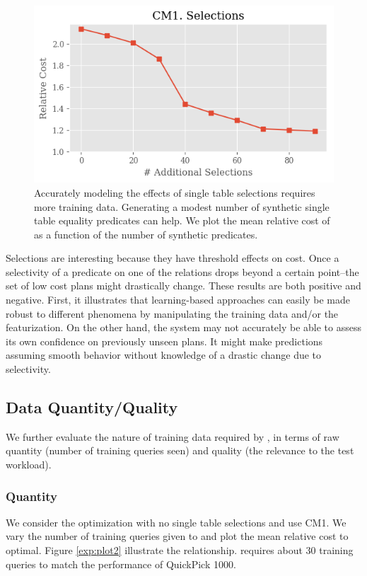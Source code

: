 \begin{figure}
    \centering
    \includegraphics[width=0.8\columnwidth]{exp/exp1_plot1.png}
    \caption{\small{Accurately modeling the effects of single table selections requires more training data. Generating a modest number of synthetic single table equality predicates can help. We plot the mean relative cost of \sys as a function of the number of synthetic predicates.} \label{exp:plot1}}
\end{figure}

Selections are interesting because they have threshold effects on cost. Once a selectivity of a predicate on one of the relations drops beyond a certain point--the set of low cost plans might drastically change. These results are both positive and negative. First, it illustrates that learning-based approaches can easily be made robust to different phenomena by manipulating the training data and/or the featurization. On the other hand, the system may not accurately be able to assess its own confidence on previously unseen plans. It might make predictions assuming smooth behavior without knowledge of a drastic change due to selectivity. 

\subsection{Data Quantity/Quality}
We further evaluate the nature of training data required by \sys, in terms of raw quantity (number of training queries seen) and quality (the relevance to the test workload).

\subsubsection{Quantity}
We consider the optimization with no single table selections and use CM1. We vary the number of training queries given to \sys and plot the mean relative cost to optimal. Figure \ref{exp:plot2} illustrate the relationship. \sys requires about 30 training queries to match the performance of QuickPick 1000.

